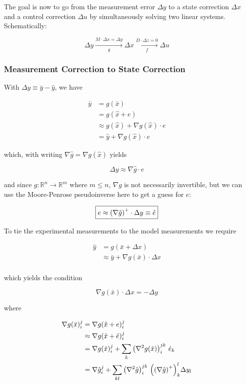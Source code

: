 \documentclass{article}
\begin{document}
The goal is now to go from the measurement error $\Delta y$ to a state correction $\Delta x$ and a control correction $\Delta u$ by simultaneously solving two linear systems.  Schematically:

$$
\Delta y \xrightarrow[g]{M \cdot \Delta x = \Delta y} \Delta x \xrightarrow[f]{D \cdot \Delta z = 0} \Delta u
$$

\subsubsection*{Measurement Correction to State Correction}

With $\Delta y \equiv \bar y - \hat y$, we have

\begin{align*}
  \bar y &= g(\bar x) \\
  &= g(\hat x + e) \\ 
  &\approx g(\hat x) + \nabla g(\hat x) \cdot e \\
  &= \hat y + \nabla g(\hat x) \cdot e  
\end{align*}

 
which, with writing $\nabla \hat g = \nabla g(\hat x)$ yields

$$
\Delta y \approx \nabla \hat g \cdot e 
$$


and since $g: \mathbb{R}^n \to \mathbb{R}^m$ where $m \leq n$, $\nabla g$ is not necessarily invertible, but we can use the Moore-Penrose pseudoinverse here to get a guess for $e$:

$$
\boxed{
e \approx \qty(\nabla \hat g)^+ \cdot \Delta y \equiv \hat e 
}
$$



To tie the experimental measurements to the model measurements we require 

\begin{align*}
\hat y &= g(\bar x + \Delta x) \\ 
&\approx \bar y + \nabla g(\bar x) \cdot \Delta x \\
\end{align*}


which yields the condition

\begin{equation}
  \boxed{
  \nabla g(\bar x) \cdot \Delta x = - \Delta y
  }
\end{equation}



where

\begin{align*}
  \nabla g(\bar x)_i^j &= \nabla g(\hat x + e)_i^j \\
  & \approx  \nabla g(\hat x + \hat e)_i^j \\
  &= \nabla g(\hat x)_i^j + \sum_k \qty(\nabla^2 g(\hat x))_i^{jk} \ \hat e_k \\
  &= \nabla \hat g_i^j + \sum_{kl} \qty(\nabla^2 \hat g)_i^{jk} \ \qty(\qty(\nabla \hat g)^+)_k^l \Delta y_l 
\end{align*}
\end{document}
